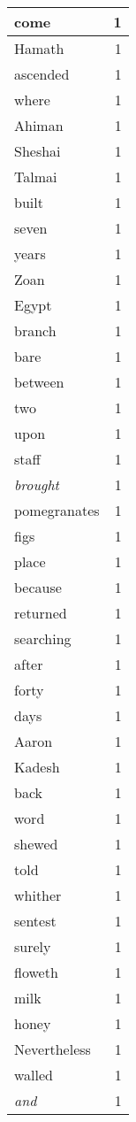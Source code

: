\begin{center}
\begin{longtable}{l|r}
come & 1\\ \hline 
Hamath & 1\\ \hline 
ascended & 1\\ \hline 
where & 1\\ \hline 
Ahiman & 1\\ \hline 
Sheshai & 1\\ \hline 
Talmai & 1\\ \hline 
built & 1\\ \hline 
seven & 1\\ \hline 
years & 1\\ \hline 
Zoan & 1\\ \hline 
Egypt & 1\\ \hline 
branch & 1\\ \hline 
bare & 1\\ \hline 
between & 1\\ \hline 
two & 1\\ \hline 
upon & 1\\ \hline 
staff & 1\\ \hline 
\emph{brought} & 1\\ \hline 
pomegranates & 1\\ \hline 
figs & 1\\ \hline 
place & 1\\ \hline 
because & 1\\ \hline 
returned & 1\\ \hline 
searching & 1\\ \hline 
after & 1\\ \hline 
forty & 1\\ \hline 
days & 1\\ \hline 
Aaron & 1\\ \hline 
Kadesh & 1\\ \hline 
back & 1\\ \hline 
word & 1\\ \hline 
shewed & 1\\ \hline 
told & 1\\ \hline 
whither & 1\\ \hline 
sentest & 1\\ \hline 
surely & 1\\ \hline 
floweth & 1\\ \hline 
milk & 1\\ \hline 
honey & 1\\ \hline 
Nevertheless & 1\\ \hline 
walled & 1\\ \hline 
\emph{and} & 1\\ \hline 

\end{longtable}
\end{center}
